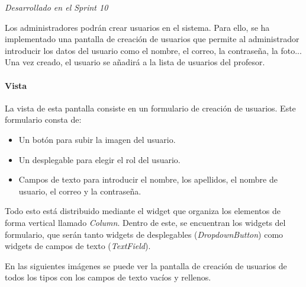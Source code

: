 \textit{Desarrollado en el Sprint 10}

Los administradores podrán crear usuarios en el sistema. Para ello, se ha implementado una pantalla de creación de usuarios que permite al administrador introducir los datos del usuario como el nombre, el correo, la contraseña, la foto... Una vez creado, el usuario se añadirá a la lista de usuarios del profesor.


\paragraph*{Vista}
La vista de esta pantalla consiste en un formulario de creación de usuarios. Este formulario consta de:
\begin{itemize}
  \item Un botón para subir la imagen del usuario.
  \item Un desplegable para elegir el rol del usuario.
  \item Campos de texto para introducir el nombre, los apellidos, el nombre de usuario, el correo y la contraseña.
\end{itemize}


Todo esto está distribuido mediante el widget que organiza los elementos de forma vertical llamado \textit{Column}. Dentro de este, se encuentran los widgets del formulario, que serán tanto widgets de desplegables (\textit{DropdownButton}) como widgets de campos de texto (\textit{TextField}).

En las siguientes imágenes se puede ver la pantalla de creación de usuarios de todos los tipos con los campos de texto vacíos y rellenos.


